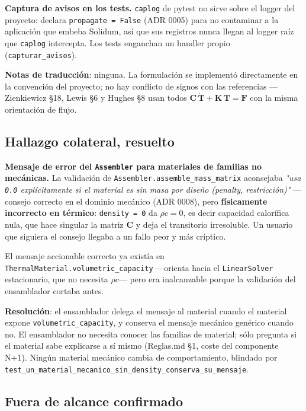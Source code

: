 \documentclass[11pt,letterpaper,oneside]{report}
\begin{document}
\textbf{Captura de avisos en los tests.} \texttt{caplog} de pytest no sirve sobre el logger del proyecto: declara \texttt{propagate = False} (ADR 0005) para no contaminar a la aplicación que embeba Solidum, así que sus registros nunca llegan al logger raíz que \texttt{caplog} intercepta. Los tests enganchan un handler propio (\texttt{capturar\_avisos}).

\textbf{Notas de traducción}: ninguna. La formulación se implementó directamente en la convención del proyecto; no hay conflicto de signos con las referencias --- Zienkiewicz §18, Lewis §6 y Hughes §8 usan todos $\mathbf C\,\dot{\mathbf T} + \mathbf K\,\mathbf T = \mathbf F$ con la misma orientación de flujo.

\subsection{Hallazgo colateral, resuelto}

\textbf{Mensaje de error del \texttt{Assembler} para materiales de familias no mecánicas.} La validación de \texttt{Assembler.assemble\_mass\_matrix} aconsejaba \textit{"usa \texttt{0.0} explícitamente si el material es sin masa por diseño (penalty, restricción)"} --- consejo correcto en el dominio mecánico (ADR 0008), pero \textbf{físicamente incorrecto en térmico}: \texttt{density = 0} da $\rho c = 0$, es decir capacidad calorífica nula, que hace singular la matriz $\mathbf C$ y deja el transitorio irresoluble. Un usuario que siguiera el consejo llegaba a un fallo peor y más críptico.

El mensaje accionable correcto ya existía en \texttt{ThermalMaterial.volumetric\_capacity} ---orienta hacia el \texttt{LinearSolver} estacionario, que no necesita $\rho c$--- pero era inalcanzable porque la validación del ensamblador cortaba antes.

\textbf{Resolución}: el ensamblador delega el mensaje al material cuando el material expone \texttt{volumetric\_capacity}, y conserva el mensaje mecánico genérico cuando no. El ensamblador no necesita conocer las familias de material; sólo pregunta si el material sabe explicarse a sí mismo (Reglas.md §1, coste del componente N+1). Ningún material mecánico cambia de comportamiento, blindado por \texttt{test\_un\_material\_mecanico\_sin\_density\_conserva\_su\_mensaje}.

\subsection{Fuera de alcance confirmado}
\end{document}
